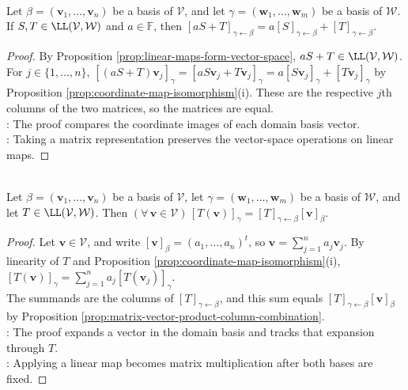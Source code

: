 \begin{proposition} \label{prop:matrix-representation-respects-linear-combinations} \\
Let $\beta=(\mathbf{v}_1,\ldots,\mathbf{v}_n)$ be a basis of $\mathcal{V}$, and let $\gamma=(\mathbf{w}_1,\ldots,\mathbf{w}_m)$ be a basis of $\mathcal{W}$.\\
If $S,T\in\LL(\mathcal{V},\mathcal{W})$ and $a\in\mathbb{F}$, then $[aS+T]_{\gamma\leftarrow\beta}=a[S]_{\gamma\leftarrow\beta}+[T]_{\gamma\leftarrow\beta}$.
\begin{proof}
By Proposition \ref{prop:linear-maps-form-vector-space}, $aS+T\in\LL(\mathcal{V},\mathcal{W})$. For $j\in\{1,\ldots,n\}$, $[(aS+T)\mathbf{v}_j]_{\gamma}=[aS\mathbf{v}_j+T\mathbf{v}_j]_{\gamma}=a[S\mathbf{v}_j]_{\gamma}+[T\mathbf{v}_j]_{\gamma}$ by Proposition \ref{prop:coordinate-map-isomorphism}(i). These are the respective $j$th columns of the two matrices, so the matrices are equal.\\
: The proof compares the coordinate images of each domain basis vector.\\
: Taking a matrix representation preserves the vector-space operations on linear maps.
\end{proof}
\end{proposition}

\begin{proposition} \label{prop:matrix-representation-action} \\
Let $\beta=(\mathbf{v}_1,\ldots,\mathbf{v}_n)$ be a basis of $\mathcal{V}$, let $\gamma=(\mathbf{w}_1,\ldots,\mathbf{w}_m)$ be a basis of $\mathcal{W}$, and let $T\in\LL(\mathcal{V},\mathcal{W})$. Then $(\forall\,\mathbf{v}\in\mathcal{V})\,[T(\mathbf{v})]_{\gamma}=[T]_{\gamma\leftarrow\beta}[\mathbf{v}]_{\beta}$.
\begin{proof}
Let $\mathbf{v}\in\mathcal{V}$, and write $[\mathbf{v}]_{\beta}=(a_1,\ldots,a_n)^t$, so $\mathbf{v}=\sum\limits_{j=1}^{n}a_j\mathbf{v}_j$. By linearity of $T$ and Proposition \ref{prop:coordinate-map-isomorphism}(i), $[T(\mathbf{v})]_{\gamma}=\sum\limits_{j=1}^{n}a_j[T(\mathbf{v}_j)]_{\gamma}$.\\
The summands are the columns of $[T]_{\gamma\leftarrow\beta}$, and this sum equals $[T]_{\gamma\leftarrow\beta}[\mathbf{v}]_{\beta}$ by Proposition \ref{prop:matrix-vector-product-column-combination}.\\
: The proof expands a vector in the domain basis and tracks that expansion through $T$.\\
: Applying a linear map becomes matrix multiplication after both bases are fixed.
\end{proof}
\end{proposition}
